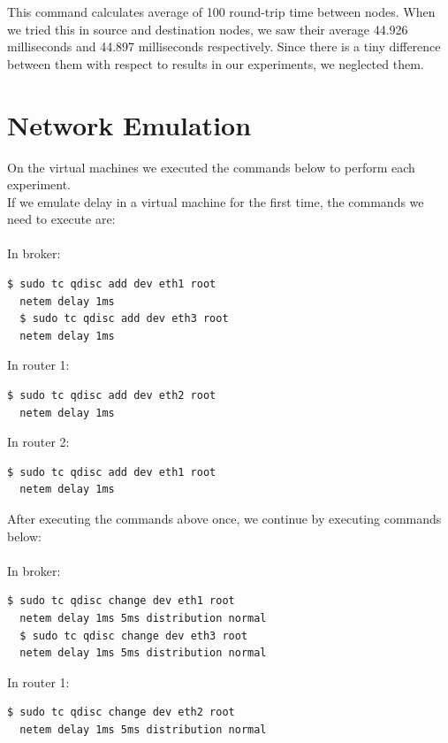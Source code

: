 \documentclass[conference]{IEEEtran}
\begin{document}
This command calculates average of 100 round-trip time between nodes. When we tried this in source and destination nodes, we saw their average 44.926 milliseconds and 44.897 milliseconds respectively. Since there is a tiny difference between them with respect to results in our experiments, we neglected them.

\section{Network Emulation}

On the virtual machines we executed the commands below to perform each experiment.\\
If we emulate delay in a virtual machine for the first time, the commands we need to execute are:\\
\\
In broker:
\begin{lstlisting}[language=bash]
  $ sudo tc qdisc add dev eth1 root 
  netem delay 1ms
  $ sudo tc qdisc add dev eth3 root 
  netem delay 1ms
\end{lstlisting}

In router 1:

\begin{lstlisting}[language=bash]
  $ sudo tc qdisc add dev eth2 root 
  netem delay 1ms
\end{lstlisting}


In router 2:

\begin{lstlisting}[language=bash]
  $ sudo tc qdisc add dev eth1 root 
  netem delay 1ms
\end{lstlisting}

After executing the commands above once, we continue by executing commands below:\\
\\
In broker:
\begin{lstlisting}[language=bash]
  $ sudo tc qdisc change dev eth1 root 
  netem delay 1ms 5ms distribution normal
  $ sudo tc qdisc change dev eth3 root 
  netem delay 1ms 5ms distribution normal
\end{lstlisting}

In router 1:

\begin{lstlisting}[language=bash]
  $ sudo tc qdisc change dev eth2 root 
  netem delay 1ms 5ms distribution normal

\end{lstlisting}
\end{document}
